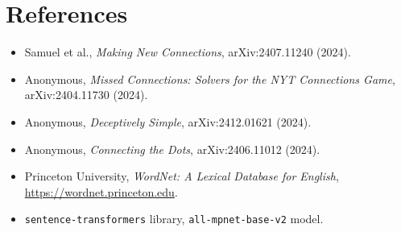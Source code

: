 \documentclass[11pt, letterpaper]{article}
\begin{document}
\section*{References}
\begin{itemize}[leftmargin=*, itemsep=0.1em]
\item Samuel et al., \emph{Making New Connections}, arXiv:2407.11240 (2024).
\item Anonymous, \emph{Missed Connections: Solvers for the NYT Connections Game}, arXiv:2404.11730 (2024).
\item Anonymous, \emph{Deceptively Simple}, arXiv:2412.01621 (2024).
\item Anonymous, \emph{Connecting the Dots}, arXiv:2406.11012 (2024).
\item Princeton University, \emph{WordNet: A Lexical Database for English}, \url{https://wordnet.princeton.edu}.
\item \texttt{sentence-transformers} library, \texttt{all-mpnet-base-v2} model.
\end{itemize}
\end{document}
